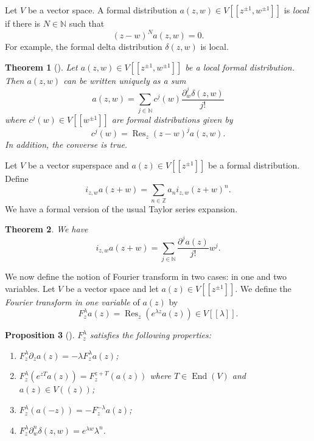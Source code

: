 \documentclass[a4paper, 12pt, reqno]{amsart}
\newtheorem{theorem}{Theorem}[subsection]
\newtheorem{proposition}[theorem]{Proposition}
\theoremstyle{remark}
\numberwithin{equation}{subsection}
\DeclareMathOperator{\End}{End}
\DeclareMathOperator{\Res}{Res}
\begin{document}
Let $V$ be a vector space.
A formal distribution $a(z, w) \in V[[z^{\pm 1}, w^{\pm 1}]]$ is \emph{local} if there is $N \in \mathbb{N}$ such that
\begin{equation*}
  (z - w)^Na(z, w)=0.
\end{equation*}
For example, the formal delta distribution $\delta(z, w)$ is local.

\begin{theorem}[{\cite[Proposition 2.2]{kac_vertex_1998}}]
  \label{thr:1}
  Let $a(z, w) \in V[[z^{\pm 1}, w^{\pm 1}]]$ be a local formal distribution.
  Then $a(z, w)$ can be written uniquely as a sum
  \begin{equation}
    \label{eq:1}
    a(z, w) = \sum_{j \in \mathbb{N}}c^j(w)\frac{\partial_w^j\delta(z, w)}{j!}
  \end{equation}
  where $c^j(w) \in V[[w^{\pm 1}]]$ are formal distributions given by
  \begin{equation}
    \label{eq:2}
    c^j(w) = \Res_z(z - w)^ja(z, w).
  \end{equation}
  In addition, the converse is true.
\end{theorem}

Let $V$ be a vector superspace and  $a(z) \in V[[z^{\pm 1}]]$ be a formal distribution.
Define
\begin{equation*}
  i_{z, w}a(z + w) = \sum_{n \in \mathbb{Z}} a_ni_{z, w}(z + w)^n.
\end{equation*}
We have a formal version of the usual Taylor series expansion.

\begin{theorem}
  \label{thr:2}
  We have
  \begin{equation*}
    i_{z, w}a(z + w) = \sum_{j \in \mathbb{N}}\frac{\partial^ja(z)}{j!}w^j.
  \end{equation*}
\end{theorem}

We now define the notion of Fourier transform in two cases: in one and two variables. Let $V$ be a vector space and let $a(z) \in V[[z^{\pm 1}]]$.
We define the \emph{Fourier transform in one variable} of $a(z)$ by
\begin{equation*}
  F^\lambda_za(z) = \Res_z(e^{\lambda z}a(z)) \in V[[\lambda]].
\end{equation*}

\begin{proposition}[{\cite[Proposition 1.5.2]{nozaradan_introduction_2008}}]
  \label{prp:1}
  $F^\lambda_z$ satisfies the following properties:
  \begin{enumerate}
  \item $F^\lambda_z\partial_za(z) = -\lambda F^\lambda_za(z)$;
  \item $F^\lambda_z(e^{zT}a(z)) = F^{z + T}_z(a(z))$ where $T \in \End(V)$ and $a(z) \in V((z))$;
  \item $F^\lambda_z(a(-z)) = -F^{-\lambda}_za(z)$;
  \item $F^\lambda_z\partial^n_w\delta(z, w) = e^{\lambda w}\lambda^n$.
  \end{enumerate}
\end{proposition}
\end{document}
